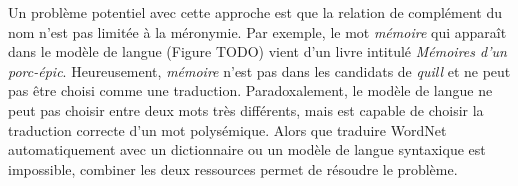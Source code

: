 %
%
%

Un problème potentiel avec cette approche est que la relation de complément du nom n'est pas limitée à la méronymie. Par exemple, le mot \textit{mémoire} qui apparaît dans le modèle de langue (Figure TODO) vient d'un livre intitulé \textit{Mémoires d'un porc-épic}. Heureusement, \textit{mémoire} n'est pas dans les candidats de \textit{quill} et ne peut pas être choisi comme une traduction. Paradoxalement, le modèle de langue ne peut pas choisir entre deux mots très différents, mais est capable de choisir la traduction correcte d'un mot polysémique. Alors que traduire WordNet automatiquement avec un dictionnaire ou un modèle de langue syntaxique est impossible, combiner les deux ressources permet de résoudre le problème.

